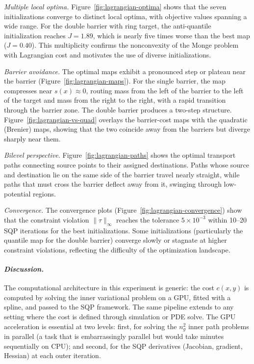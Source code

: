 \documentclass[12pt,leqno]{amsart}
\newcounter{experiment}
\begin{document}
\emph{Multiple local optima.}  Figure~\ref{fig:lagrangian-optima} shows that the seven initializations converge to distinct local optima, with objective values spanning a wide range.  For the double barrier with ring target, the anti-quantile initialization reaches $J = 1.89$, which is nearly five times worse than the best map ($J = 0.40$).  This multiplicity confirms the nonconvexity of the Monge problem with Lagrangian cost and motivates the use of diverse initializations.

\emph{Barrier avoidance.}  The optimal maps exhibit a pronounced step or plateau near the barrier (Figure~\ref{fig:lagrangian-maps}).  For the single barrier, the map compresses near $s(x) \approx 0$, routing mass from the left of the barrier to the left of the target and mass from the right to the right, with a rapid transition through the barrier zone.  The double barrier produces a two-step structure.  Figure~\ref{fig:lagrangian-vs-quad} overlays the barrier-cost maps with the quadratic (Brenier) maps, showing that the two coincide away from the barriers but diverge sharply near them.

\emph{Bilevel perspective.}  Figure~\ref{fig:lagrangian-paths} shows the optimal transport paths connecting source points to their assigned destinations.  Paths whose source and destination lie on the same side of the barrier travel nearly straight, while paths that must cross the barrier deflect away from it, swinging through low-potential regions.

\emph{Convergence.}  The convergence plots (Figure~\ref{fig:lagrangian-convergence}) show that the constraint violation $\|\tau\|_\infty$ reaches the tolerance $5 \times 10^{-3}$ within 10--20 SQP iterations for the best initializations.  Some initializations (particularly the quantile map for the double barrier) converge slowly or stagnate at higher constraint violations, reflecting the difficulty of the optimization landscape.

\paragraph{\it Discussion.}
The computational architecture in this experiment is generic: the cost $c(x,y)$ is computed by solving the inner variational problem on a GPU, fitted with a spline, and passed to the SQP framework.  The same pipeline extends to any setting where the cost is defined through simulation or PDE solve.  The GPU acceleration is essential at two levels: first, for solving the $n_g^2$ inner path problems in parallel (a task that is embarrassingly parallel but would take minutes sequentially on CPU); and second, for the SQP derivatives (Jacobian, gradient, Hessian) at each outer iteration.
\end{document}
